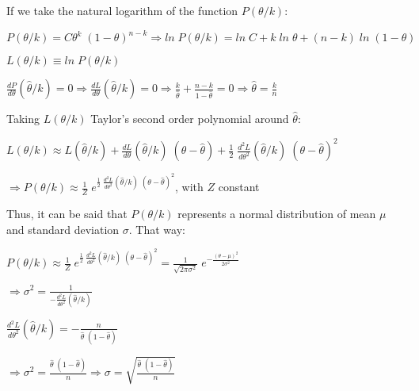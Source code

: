 \documentclass{article}
\begin{document}
\hfill

If we take the natural logarithm of the function $P(\theta/k)$:

\hfill

$P(\theta/k) = C \theta^{k} \; (1 - \theta)^{n - k} \Rightarrow ln \; P(\theta/k) = ln \; C + k \; ln \; \theta + (n - k) \; ln \; (1 - \theta)$

\hfill

$L(\theta/k) \equiv ln \; P(\theta/k)$

\hfill

$\frac{dP}{d\theta} (\hat{\theta}/k) = 0 \Rightarrow \frac{dL}{d\theta} (\hat{\theta}/k) = 0 \Rightarrow \frac{k}{\hat{\theta}} + \frac{n - k}{1 - \hat{\theta}} = 0 \Rightarrow \hat{\theta} = \frac{k}{n}$

\hfill

Taking $L(\theta/k)$ Taylor's second order polynomial around $\hat{\theta}$:

\hfill

$L(\theta/k) \approx L(\hat{\theta}/k) + \frac{dL}{d\theta} (\hat{\theta}/k) \; (\theta - \hat{\theta}) + \frac{1}{2} \; \frac{d^{2}L}{d\theta^{2}} (\hat{\theta}/k) \; (\theta - \hat{\theta})^{2}$

\hfill

$\Rightarrow P(\theta/k) \approx \frac{1}{Z} \; e^{\frac{1}{2} \; \frac{d^{2}L}{d\theta^{2}} (\hat{\theta}/k) \; (\theta - \hat{\theta})^{2}}$, with $Z$ constant

\hfill

Thus, it can be said that $P(\theta/k)$ represents a normal distribution of mean $\mu$ and standard deviation $\sigma$. That way:

\hfill

$P(\theta/k) \approx \frac{1}{Z} \; e^{\frac{1}{2} \; \frac{d^{2}L}{d\theta^{2}} (\hat{\theta}/k) \; (\theta - \hat{\theta})^{2}} = \frac{1}{\sqrt{2 \pi \sigma^{2}}} \; e^{-\frac{(\theta - \mu)^{2}}{2 \sigma^{2}}}$

\hfill

$\Rightarrow \sigma^{2} = \frac{1}{-\frac{d^{2}L}{d\theta^{2}} (\hat{\theta}/k)}$

\hfill

$\frac{d^{2}L}{d\theta^{2}} (\hat{\theta}/k) = -\frac{n}{\hat{\theta} \; (1 - \hat{\theta})}$

\hfill

$\Rightarrow \sigma^{2} = \frac{\hat{\theta} \; (1 - \hat{\theta})}{n} \Rightarrow \sigma = \sqrt{\frac{\hat{\theta} \; (1 - \hat{\theta})}{n}}$
\end{document}

